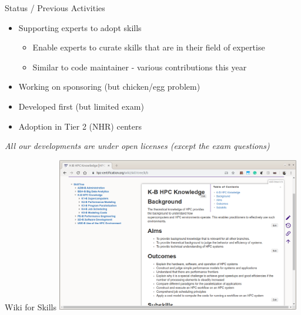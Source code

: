 \documentclass[compress,aspectratio=169]{beamer}
\begin{document}
\begin{frame}{Status / Previous Activities}
\vspace*{-1.5cm}

\begin{block}{}
\begin{itemize}
\item Supporting experts to adopt skills
\begin{itemize}
  \item Enable experts to curate skills that are in their field of expertise
  \item Similar to code maintainer - various contributions this year
\end{itemize}
\item Working on sponsoring (but chicken/egg problem)
\item Developed first (but limited exam)
\item Adoption in Tier 2 (NHR) centers
\end{itemize}
\end{block}

\medskip

\textit{All our developments are under open licenses (except the exam questions)}
\end{frame}


\begin{frame}{Wiki for Skills}
  \includegraphics[width=0.8\textwidth]{www}
\end{frame}
\end{document}
